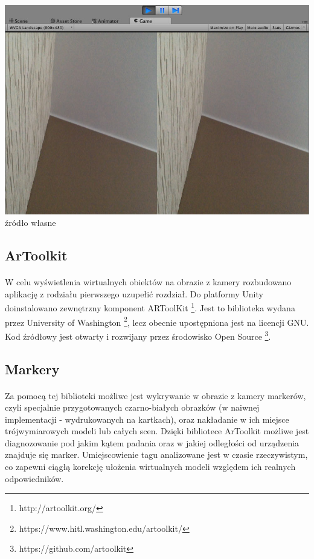 \begin{center}
\includegraphics[width=1\textwidth]{images/kadr.jpg}
\small {źródło własne}
\end{center}

\subsection{ArToolkit}
\paragraph{}
W celu wyświetlenia wirtualnych obiektów na obrazie z kamery rozbudowano aplikację z rodziału pierwszego {\color{red}uzupełić rozdział}. Do platformy Unity doinstalowano zewnętrzny komponent ARToolKit  \footnote{http://artoolkit.org/}. Jest to biblioteka wydana przez University of Washington \footnote{https://www.hitl.washington.edu/artoolkit/}, lecz obecnie upostępniona jest na licencji GNU. Kod źródłowy jest otwarty i rozwijany przez środowisko Open Source \footnote{https://github.com/artoolkit}.
\subsection{Markery}
\paragraph{}
Za pomocą tej biblioteki możliwe jest wykrywanie w obrazie z kamery markerów, czyli specjalnie przygotowanych czarno-białych obrazków (w naiwnej implementacji - wydrukowanych na kartkach), oraz nakładanie w ich miejsce trójwymiarowych modeli lub całych scen. Dzięki bibliotece ArToolkit możliwe jest diagnozowanie pod jakim kątem padania oraz w jakiej odległości od urządzenia znajduje się marker. Umiejscowienie tagu analizowane jest w czasie rzeczywistym, co zapewni ciągłą korekcję ułożenia wirtualnych modeli względem ich realnych odpowiedników.

